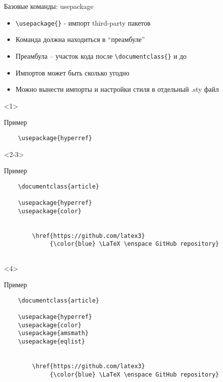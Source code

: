 \begin{frame}[fragile]{Базовые команды: usepackage}

\begin{itemize}[<+->]
    \item \lstinline!\usepackage{}! - импорт third-party пакетов
    \item Команда должна находиться в ``преамбуле''
    \item Преамбула -- участок кода после \lstinline!\documentclass{}!
    и до \lstinline!!
    \item Импортов может быть сколько угодно
    \item Можно вынести импорты и настройки стиля в отдельный .sty файл
\end{itemize}

\begin{onlyenv}<1>
    \begin{block}{Пример}
        \begin{lstlisting}
    \usepackage{hyperref}
        \end{lstlisting}
    \end{block}
\end{onlyenv}

\begin{onlyenv}<2-3>
    \begin{block}{Пример}
        \begin{lstlisting}
    \documentclass{article}
    
    \usepackage{hyperref}
    \usepackage{color}
    
    
        \href{https://github.com/latex3}
             {\color{blue} \LaTeX \enspace GitHub repository}
    
        \end{lstlisting}
    \end{block}
\end{onlyenv}

\begin{onlyenv}<4>
    \begin{block}{Пример}
        \begin{lstlisting}
    \documentclass{article}
    
    \usepackage{hyperref}
    \usepackage{color}
    \usepackage{amsmath}
    \usepackage{eqlist}
    
    
        \href{https://github.com/latex3}
             {\color{blue} \LaTeX \enspace GitHub repository}
    
        \end{lstlisting}
    \end{block}
\end{onlyenv}


\end{frame}
